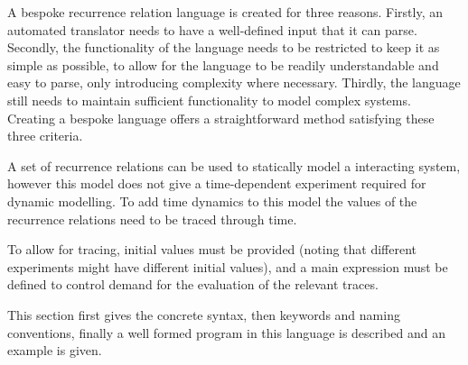 \documentclass{article}
\begin{document}
A bespoke recurrence relation language is created for three reasons. Firstly, an automated translator needs to have a well-defined input that it can parse. Secondly, the functionality of the language needs to be restricted to keep it as simple as possible, to allow for the language to be readily understandable and easy to parse, only introducing complexity where necessary. Thirdly, the language still needs to maintain sufficient functionality to model complex systems. Creating a bespoke language offers a straightforward method satisfying these three criteria.

A set of recurrence relations can be used to statically model a interacting system, however this model does not give a time-dependent experiment required for dynamic modelling. To add time dynamics to this model the values of the recurrence relations need to be traced through time.

To allow for tracing, initial values must be provided (noting that different experiments might have different initial values), and a main expression must be defined to control demand for the evaluation of the relevant traces.

This section first gives the concrete syntax, then keywords and naming conventions, finally a well formed program in this language is described and an example is given.  
 
\end{document}
